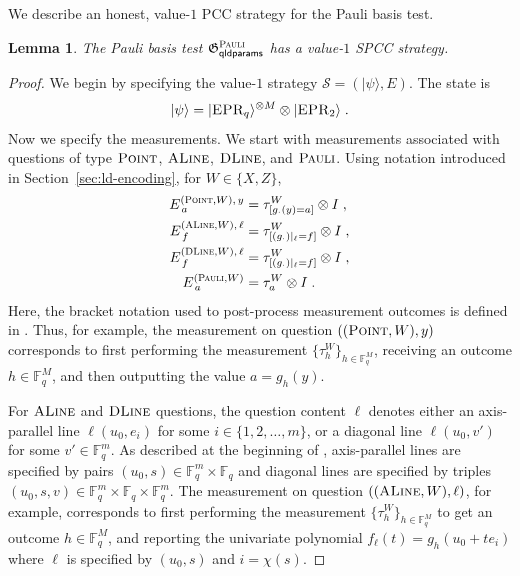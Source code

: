 \documentclass[11pt]{article}
\newtheorem{lemma}[theorem]{Lemma}
\theoremstyle{definition}
\newcommand{\ket}[1]{|#1\rangle}
\newcommand{\F}{\ensuremath{\mathbb{F}}}
\newcommand{\game}{\mathfrak{G}}
\newcommand{\strategy}{\mathscr{S}}
\newcommand{\gamestyle}[1]{\ensuremath{\textsc{#1}}\xspace}
\newcommand{\pauli}{\gamestyle{Pauli}}
\newcommand{\labelstyle}[1]{\ensuremath{\textsc{#1}}\xspace}
\newcommand{\EPR}{\labelstyle{EPR}}
\newcommand{\typestyle}[1]{\ensuremath{\textsc{#1}}\xspace}
\renewcommand{\line}{\mathbf{\ell}}
\newcommand{\Point}{\typestyle{Point}}
\newcommand{\ALine}{\typestyle{ALine}}
\newcommand{\DLine}{\typestyle{DLine}}
\newcommand{\Pauli}{\typestyle{Pauli}}
\newcommand{\qldparams}{\mathsf{qldparams}}
\begin{document}
We describe an honest, value-$1$ PCC strategy for the Pauli basis test.


\begin{lemma}\label{lem:pauli-completeness}
  The Pauli basis test $\game^\pauli_\qldparams$ has a value-$1$ SPCC strategy.
\end{lemma}

\begin{proof}
  We begin by specifying the value-$1$ strategy $\strategy = (\ket{\psi}, E)$.
  The state is
  \begin{equation*}
    \ket{\psi} = \ket{\EPR_q}^{\otimes M} \otimes \ket{\EPR_2}\;.
  \end{equation*}
  Now we specify the measurements.
  We start with measurements associated with questions of type $\Point$,
  $\ALine$, $\DLine$, and $\Pauli$.
  Using notation introduced in Section~\ref{sec:ld-encoding}, for $W \in \{X,
  Z\}$,
  \begin{align*}
    E^{(\Point,W),\, y}_{\, a}
    & = \tau^W_{[g_{\cdot}(y) = a]} \otimes I\;,\\
    E^{(\ALine,W),\, \line}_{\, f}
    & = \tau^W_{[(g_{\cdot})|_\line = f]} \otimes I\;,\\
    E^{(\DLine,W),\, \line}_{\, f}
    & = \tau^W_{[(g_{\cdot})|_\line = f]} \otimes I\;,\\    
    E^{(\Pauli,W)}_{\, a}
    & = \tau^W_{a} \otimes I\;.
  \end{align*}
  Here, the bracket notation used to post-process measurement outcomes is
  defined in .
  Thus, for example, the measurement on question $((\Point,W),y)$ corresponds to
  first performing the measurement $\{\tau^W_h\}_{h \in \F_q^M}$, receiving an
  outcome $h \in \F_q^M$, and then outputting the value $a = g_{h}(y)$.

  For $\ALine$ and $\DLine$ questions, the question content $\line$ denotes
  either an axis-parallel line $\line(u_0,e_i)$ for some $i \in
  \{1,2,\ldots,m\}$, or a diagonal line $\line(u_0,v')$ for some $v' \in
  \F_q^m$.
  As described at the beginning of , axis-parallel lines are
  specified by pairs $(u_0,s) \in \F_q^m \times \F_q$ and diagonal lines are
  specified by triples $(u_0,s,v) \in \F_q^m \times \F_q \times \F_q^m$.
  The measurement on question $((\ALine,W),\line)$, for example, corresponds to
  first performing the measurement $\{\tau^W_h\}_{h \in \F_q^M}$ to get an
  outcome $h \in \F_q^M$, and reporting the univariate polynomial $f_\line(t) =
  g_{h}(u_0 + te_i)$ where $\line$ is specified by $(u_0,s)$ and $i = \chi(s)$.
  



\end{proof}
\end{document}
